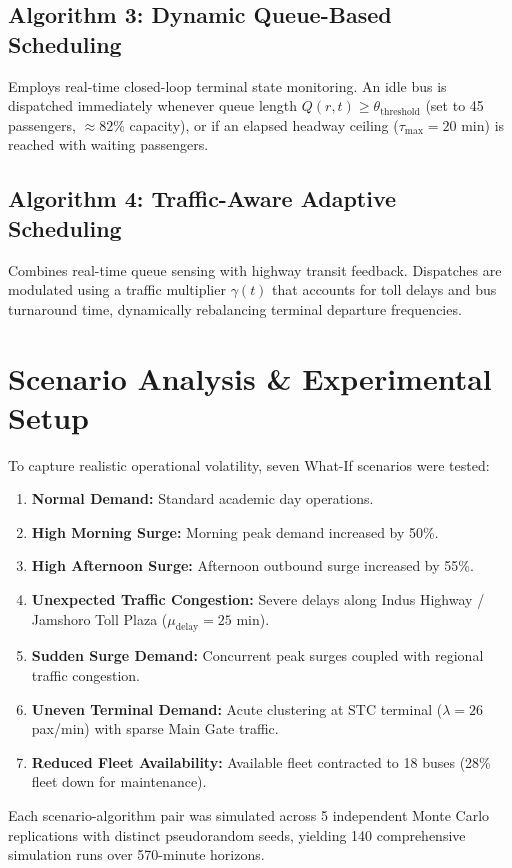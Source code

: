 \documentclass[conference]{IEEEtran}
\begin{document}
\subsection{Algorithm 3: Dynamic Queue-Based Scheduling}
Employs real-time closed-loop terminal state monitoring. An idle bus is dispatched immediately whenever queue length $Q(r, t) \ge \theta_{\text{threshold}}$ (set to 45 passengers, $\approx 82\%$ capacity), or if an elapsed headway ceiling ($\tau_{\text{max}} = 20$ min) is reached with waiting passengers.

\subsection{Algorithm 4: Traffic-Aware Adaptive Scheduling}
Combines real-time queue sensing with highway transit feedback. Dispatches are modulated using a traffic multiplier $\gamma(t)$ that accounts for toll delays and bus turnaround time, dynamically rebalancing terminal departure frequencies.

\section{Scenario Analysis \& Experimental Setup}
To capture realistic operational volatility, seven What-If scenarios were tested:
\begin{enumerate}
    \item \textbf{Normal Demand:} Standard academic day operations.
    \item \textbf{High Morning Surge:} Morning peak demand increased by 50\%.
    \item \textbf{High Afternoon Surge:} Afternoon outbound surge increased by 55\%.
    \item \textbf{Unexpected Traffic Congestion:} Severe delays along Indus Highway / Jamshoro Toll Plaza ($\mu_{\text{delay}} = 25$ min).
    \item \textbf{Sudden Surge Demand:} Concurrent peak surges coupled with regional traffic congestion.
    \item \textbf{Uneven Terminal Demand:} Acute clustering at STC terminal ($\lambda=26$ pax/min) with sparse Main Gate traffic.
    \item \textbf{Reduced Fleet Availability:} Available fleet contracted to 18 buses (28\% fleet down for maintenance).
\end{enumerate}
Each scenario-algorithm pair was simulated across 5 independent Monte Carlo replications with distinct pseudorandom seeds, yielding 140 comprehensive simulation runs over 570-minute horizons.
\end{document}

